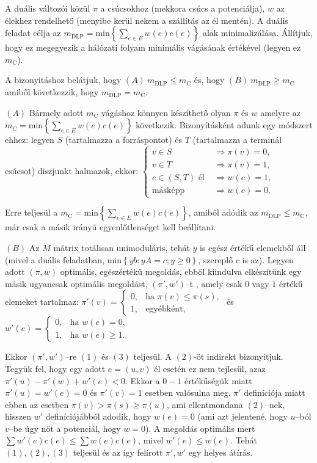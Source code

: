 A duális változói közül $\pi$ a csúcsokhoz (mekkora csúcs a potenciálja), $w$ az
élekhez rendelhető (menyibe kerül nekem a szállítás az él mentén). A duális
feladat célja az $m_{\text{DLP}}= \mbox{min} \left\{ \sum_{e\in E}^{}
w(e)c(e)\right\}$ alak minimalizálása. Állítjuk, hogy ez megegyezik a hálózati
folyam minimális vágásának értékével (legyen ez $m_{\text{C}}$). 

A bizonyitáshoz belátjuk, hogy $(A)~m_{\mbox{DLP}} \leq m_{\mbox{C}}$ és, hogy
$(B)~m_{\mbox{DLP}} \geq m_{\mbox{C}}$ amiből következzik, hogy $ m_{\mbox{DLP}}
= m_{\mbox{C}}$.

$(A)$ Bármely adott $m_{\mbox{C}}$ vágáshoz könnyen készíthető olyan $\pi$ és $w$
amelyre az $m_{\text{C}}= \mbox{min} \left\{ \sum_{e\in E}^{} w(e)c(e)\right\}$
következik. Bizonyításként adunk egy módszert ehhez: legyen $S$ (tartalmazza a
forráspontot) és $T$ (tartalmazza a terminál csúcsot) diszjunkt halmazok, ekkor:
$\begin{cases}
v \in S &\Rightarrow \pi(v)=0, \\
v \in T &\Rightarrow \pi(v)=1, \\
e \in (S,T) \mbox{ él } &\Rightarrow w(e)=1, \\
\mbox{másképp} &\Rightarrow w(e)=0.
\end{cases}$

Erre teljesül a $m_{\text{C}}= \mbox{min} \left\{ \sum_{e\in E}^{}
w(e)c(e)\right\}$, amiből adódik az $m_{\mbox{DLP}} \leq m_{\mbox{C}}$, már csak
a másik irányú egyenlőtlenséget kell beállítani. 

$(B)$ Az $M$ mátrix totálisan unimoduláris, tehát $y$ is egész értékű elemekből
áll (mivel a duális feladatban, min$\left\{ yb:yA=c; y\geq 0 \right\}$, szereplő
$c$ is az). Legyen adott $(\pi,w)$ optimális, egészértékű megoldás, ebből
kiindulva elkészítünk egy másik ugyancsak optimális megoldást, $(\pi',w')$--t
, amely csak $0$ vagy $1$ értékű elemeket tartalmaz:
$\pi'(v)=
\begin{cases}
0, &\mbox{ha } \pi(v) \leq \pi(s), \\
1, &\mbox{egyébként},
\end{cases}$ és
$w'(e)=
\begin{cases}
0, &\mbox{ha } w(e)=0, \\
1, &\mbox{ha } w(e) \geq 1.
\end{cases}$

Ekkor $(\pi',w')$--re $(1)$ és $(3)$ teljesül. A $(2)$-öt indirekt bizonyítjuk.
Tegyük fel, hogy egy adott $e=(u,v)$ él esetén ez nem tejlesül, azaz
$\pi'(u)-\pi'(w)+w'(e)<0$. Ekkor a $0-1$ értékűségük miatt $\pi'(u)=w'(e)=0$ és
$\pi'(v)=1$ esetben valósulna meg. $\pi'$ definíciója miatt ebben az esetben
$\pi(v) > \pi(s) \geq \pi(u)$, ami ellentmondana $(2)$--nek, hisszen $w'$
definíciójábból adodik, hogy $w(e)=0$ (ami azt jelentené, hogy $u$--ból $v$--be
úgy nőt a potenciál, hogy $w=0$). A megoldás optimális mert $\sum w'(e)c(e) \leq
\sum w(e)c(e)$, mivel $w'(e) \leq w(e)$. Tehát $(1), (2), (3)$ teljesül és az így
felírott $\pi', w'$ egy helyes átírás.

